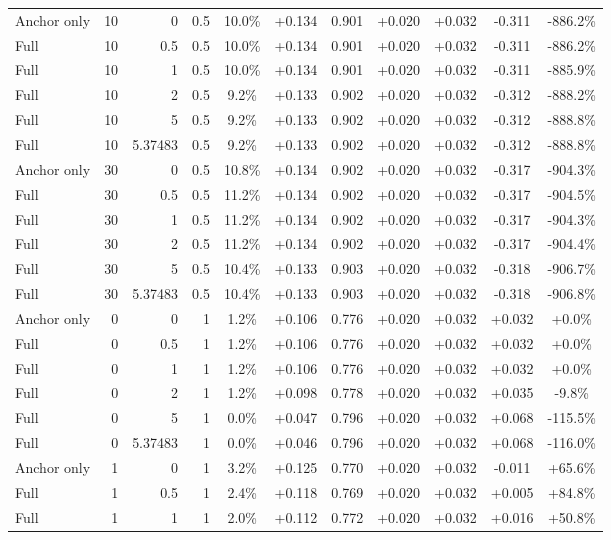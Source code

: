 \begin{table}[htbp]
\begin{tabular}{lrrrccccccc}
Anchor only & 10 & 0 & 0.5 & 10.0\% & +0.134 & 0.901 & +0.020 & +0.032 & -0.311 & -886.2\% \\
Full & 10 & 0.5 & 0.5 & 10.0\% & +0.134 & 0.901 & +0.020 & +0.032 & -0.311 & -886.2\% \\
Full & 10 & 1 & 0.5 & 10.0\% & +0.134 & 0.901 & +0.020 & +0.032 & -0.311 & -885.9\% \\
Full & 10 & 2 & 0.5 & 9.2\% & +0.133 & 0.902 & +0.020 & +0.032 & -0.312 & -888.2\% \\
Full & 10 & 5 & 0.5 & 9.2\% & +0.133 & 0.902 & +0.020 & +0.032 & -0.312 & -888.8\% \\
Full & 10 & 5.37483 & 0.5 & 9.2\% & +0.133 & 0.902 & +0.020 & +0.032 & -0.312 & -888.8\% \\
Anchor only & 30 & 0 & 0.5 & 10.8\% & +0.134 & 0.902 & +0.020 & +0.032 & -0.317 & -904.3\% \\
Full & 30 & 0.5 & 0.5 & 11.2\% & +0.134 & 0.902 & +0.020 & +0.032 & -0.317 & -904.5\% \\
Full & 30 & 1 & 0.5 & 11.2\% & +0.134 & 0.902 & +0.020 & +0.032 & -0.317 & -904.3\% \\
Full & 30 & 2 & 0.5 & 11.2\% & +0.134 & 0.902 & +0.020 & +0.032 & -0.317 & -904.4\% \\
Full & 30 & 5 & 0.5 & 10.4\% & +0.133 & 0.903 & +0.020 & +0.032 & -0.318 & -906.7\% \\
Full & 30 & 5.37483 & 0.5 & 10.4\% & +0.133 & 0.903 & +0.020 & +0.032 & -0.318 & -906.8\% \\
Anchor only & 0 & 0 & 1 & 1.2\% & +0.106 & 0.776 & +0.020 & +0.032 & +0.032 & +0.0\% \\
Full & 0 & 0.5 & 1 & 1.2\% & +0.106 & 0.776 & +0.020 & +0.032 & +0.032 & +0.0\% \\
Full & 0 & 1 & 1 & 1.2\% & +0.106 & 0.776 & +0.020 & +0.032 & +0.032 & +0.0\% \\
Full & 0 & 2 & 1 & 1.2\% & +0.098 & 0.778 & +0.020 & +0.032 & +0.035 & -9.8\% \\
Full & 0 & 5 & 1 & 0.0\% & +0.047 & 0.796 & +0.020 & +0.032 & +0.068 & -115.5\% \\
Full & 0 & 5.37483 & 1 & 0.0\% & +0.046 & 0.796 & +0.020 & +0.032 & +0.068 & -116.0\% \\
Anchor only & 1 & 0 & 1 & 3.2\% & +0.125 & 0.770 & +0.020 & +0.032 & -0.011 & +65.6\% \\
Full & 1 & 0.5 & 1 & 2.4\% & +0.118 & 0.769 & +0.020 & +0.032 & +0.005 & +84.8\% \\
Full & 1 & 1 & 1 & 2.0\% & +0.112 & 0.772 & +0.020 & +0.032 & +0.016 & +50.8\% \\

\end{tabular}
\end{table}
